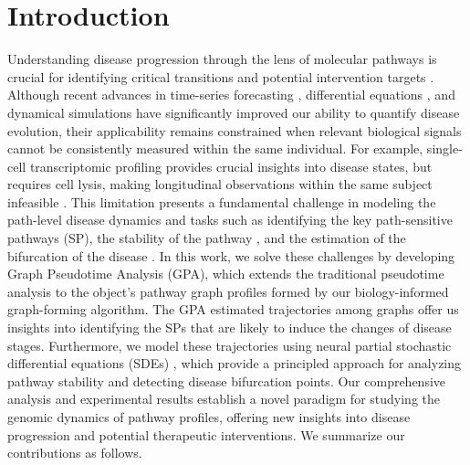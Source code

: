 \documentclass{article} %
\begin{document}
\section{Introduction}
Understanding disease progression through the lens of molecular pathways is crucial for identifying critical transitions and potential intervention targets \citep{liu2013pathway}. Although recent advances in time-series forecasting \citep{tripto2020evaluation}, differential equations \citep{xie2024rna}, and dynamical simulations \citep{xu2024equivariant, satorras2021n} have significantly improved our ability to quantify disease evolution, their applicability remains constrained when relevant biological signals cannot be consistently measured within the same individual. For example, single-cell transcriptomic profiling provides crucial insights into disease states, but requires cell lysis, making longitudinal observations within the same subject infeasible \citep{chen2022live}. This limitation presents a fundamental challenge in modeling the path-level disease dynamics and tasks such as identifying the key path-sensitive pathways (SP), the stability of the pathway \citep{khasminskii2012stochastic}, and the estimation of the bifurcation of the disease \citep{flores2023bifurcation}. In this work, we solve these challenges by developing Graph Pseudotime Analysis (GPA), which extends the traditional pseudotime analysis \citep{qiu2017single} to the object's pathway graph profiles formed by our biology-informed graph-forming algorithm. The GPA estimated trajectories among graphs offer us insights into identifying the SPs that are likely to induce the changes of disease stages. Furthermore, we model these trajectories using neural partial stochastic differential equations (SDEs) \citep{li2020scalable}, which provide a principled approach for analyzing pathway stability and detecting disease bifurcation points. Our comprehensive analysis and experimental results establish a novel paradigm for studying the genomic dynamics of pathway profiles, offering new insights into disease progression and potential therapeutic interventions. We summarize our contributions as follows. 
\end{document}
